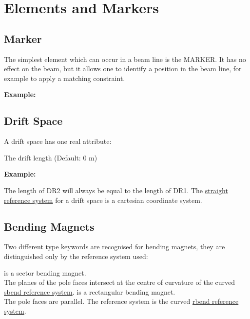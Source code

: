 
\chapter{Elements and Markers}

\section{Marker}
\label{sec:marker}

The simplest element which can occur in a beam line is the MARKER. It
has no effect on the beam, but it allows one to identify a position in
the beam line, for example to apply a matching constraint.  

{\bf Example:}


\section{Drift Space}
\label{sec:drift}


A drift space has one real attribute: 
\begin{madlist}
    The drift length (Default: 0 m) 
\end{madlist}

{\bf Example: }

The length of DR2 will always be equal to the length of DR1. The
\hyperref[subsec:local_straight]{straight reference system} for a drift
space is a cartesian coordinate system.   


\section{Bending Magnets}
\label{sec:bend}
Two different type keywords are recognised for bending magnets, they are
distinguished only by the reference system used:  
\begin{madlist}
  \label{bend_sbend} is a sector bending magnet. \\
  The planes of the pole faces intersect at the centre of curvature of
  the curved 
  \hyperref[subsec:local_rbend]{sbend reference system}.  
  \label{bend_rbend} is a rectangular bending magnet. \\ 
  The pole faces are parallel. The reference system is the curved  
  \hyperref[subsec:local_rbend]{rbend reference system}.
\end{madlist}

